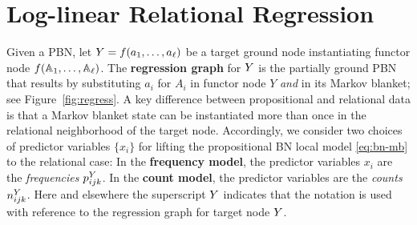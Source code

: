 \documentclass{article}
\begin{document}
\section{Log-linear Relational Regression}

%
Given a PBN, let $Y = f(a_{1},\ldots,a_{\ell})$ be a target ground node instantiating functor node $f(\mathbb{A}_{1},\ldots,\mathbb{A}_{\ell})$.
The \textbf{regression graph} for $Y$ is the partially ground PBN %
that results by substituting $a_{i}$ for $A_{i}$ in functor node $Y$ {\em and} in its Markov blanket; see Figure~\ref{fig:regress}. A key difference between propositional and relational data is that a Markov blanket state can be instantiated more than once in the relational neighborhood of the target node.
Accordingly, we consider two choices of predictor variables $\{x_{i}\}$ for lifting the propositional BN local model \eqref{eq:bn-mb} to the relational case: 
%
%
In the \textbf{frequency model}, the predictor variables $x_{i}$ are the {\em frequencies} $p^{Y}_{ijk}$. In the \textbf{count model},
the predictor variables are the {\em counts} $n^{Y}_{ijk}$.
%
Here and elsewhere the superscript $Y$ indicates that the notation is used with reference to the regression graph for target node $Y$. 
\end{document}
